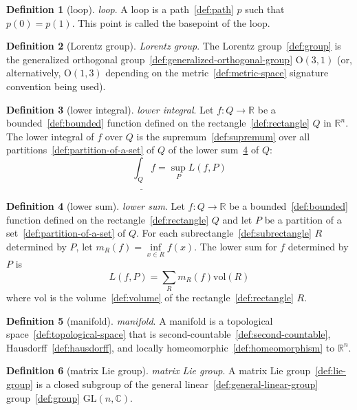 \documentclass[12pt,a4paper]{article}
\theoremstyle{definition}
\newtheorem{definition}{Definition}
\begin{document}
\begin{definition}[loop]\label{def:loop}
\emph{loop}. A loop is a path~\ref{def:path} $p$ such that $p(0) = p(1)$. This point is called the basepoint of the loop.
\end{definition}

\begin{definition}[Lorentz group]\label{def:lorentz-group}
\emph{Lorentz group}. The Lorentz group~\ref{def:group} is the generalized orthogonal group~\ref{def:generalized-orthogonal-group} $\text{O}(3,1)$ (or, alternatively, $\text{O}(1,3)$ depending on the metric~\ref{def:metric-space} signature convention being used).
\end{definition}

\begin{definition}[lower integral]\label{def:lower-integral}
\emph{lower integral}. Let $f:Q\to\mathbb R$ be a bounded~\ref{def:bounded} function defined on the rectangle~\ref{def:rectangle} $Q$ in $\mathbb R^n$. The lower integral of $f$ over $Q$ is the supremum~\ref{def:supremum} over all partitions~\ref{def:partition-of-a-set} of $Q$ of the lower sum~\ref{def:lower-sum} of $Q$: $$\underline{\int_Q}f = \sup_P L(f,P)$$
\end{definition}

\begin{definition}[lower sum]\label{def:lower-sum}
\emph{lower sum}. Let $f: Q\to \mathbb R$ be a bounded~\ref{def:bounded} function defined on the rectangle~\ref{def:rectangle} $Q$ and let $P$ be a partition of a set~\ref{def:partition-of-a-set} of $Q$. For each subrectangle~\ref{def:subrectangle} $R$ determined by $P$, let $m_R(f) = \inf\limits_{x\in R} f(x)$. The lower sum for $f$ determined by $P$ is $$L(f,P) = \sum_{R} m_R(f)\text{vol}(R)$$ where $\text{vol}$ is the volume~\ref{def:volume} of the rectangle~\ref{def:rectangle} $R$.
\end{definition}

\begin{definition}[manifold]\label{def:manifold}
\emph{manifold}. A manifold is a topological space~\ref{def:topological-space} that is second-countable~\ref{def:second-countable}, Hausdorff~\ref{def:hausdorff}, and locally homeomorphic~\ref{def:homeomorphism} to $\mathbb R^n$.
\end{definition}

\begin{definition}[matrix Lie group]\label{def:matrix-lie-group}
\emph{matrix Lie group}. A matrix Lie group~\ref{def:lie-group} is a closed subgroup of the general linear~\ref{def:general-linear-group} group~\ref{def:group} $\text{GL}(n,\mathbb C)$.
\end{definition}
\end{document}
